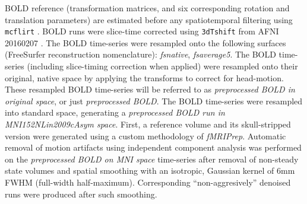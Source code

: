\begin{description}
BOLD reference (transformation matrices, and six corresponding rotation
and translation parameters) are estimated before any spatiotemporal
filtering using \texttt{mcflirt} \citep[FSL 5.0.9,][]{mcflirt}. BOLD
runs were slice-time corrected using \texttt{3dTshift} from AFNI
20160207 \citep[RRID:SCR\_005927]{afni}. The BOLD time-series were
resampled onto the following surfaces (FreeSurfer reconstruction
nomenclature): \emph{fsnative}, \emph{fsaverage5}. The BOLD time-series
(including slice-timing correction when applied) were resampled onto
their original, native space by applying the transforms to correct for
head-motion. These resampled BOLD time-series will be referred to as
\emph{preprocessed BOLD in original space}, or just \emph{preprocessed
BOLD}. The BOLD time-series were resampled into standard space,
generating a \emph{preprocessed BOLD run in MNI152NLin2009cAsym space}.
First, a reference volume and its skull-stripped version were generated
using a custom methodology of \emph{fMRIPrep}. Automatic removal of
motion artifacts using independent component analysis
\citep[ICA-AROMA,][]{aroma} was performed on the \emph{preprocessed BOLD
on MNI space} time-series after removal of non-steady state volumes and
spatial smoothing with an isotropic, Gaussian kernel of 6mm FWHM
(full-width half-maximum). Corresponding ``non-aggresively'' denoised
runs were produced after such smoothing.

\end{description}
